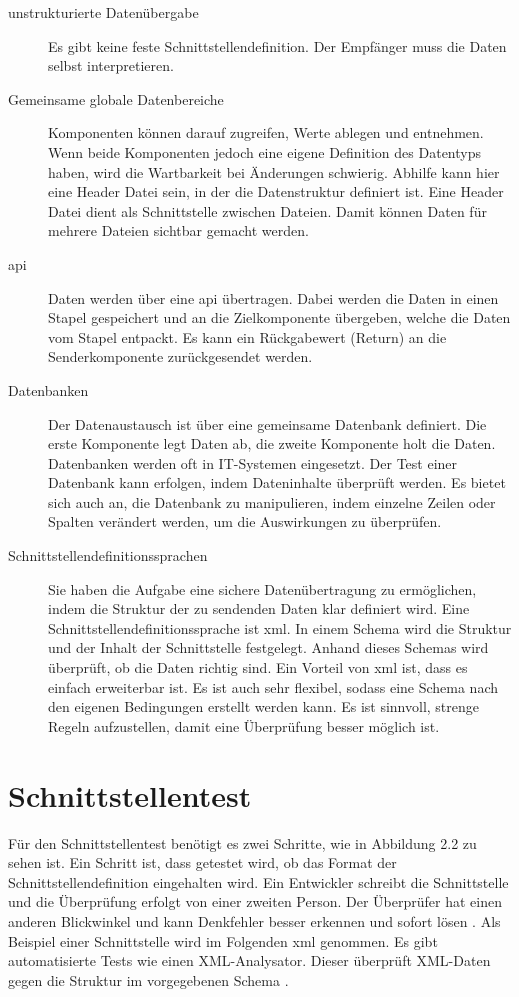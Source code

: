 \begin{description}
\item[unstrukturierte Datenübergabe] Es gibt keine feste Schnittstellendefinition. 
Der Empfänger muss die Daten selbst interpretieren. %
\item[Gemeinsame globale Datenbereiche] Komponenten können darauf zugreifen, Werte ablegen und entnehmen.
Wenn beide Komponenten jedoch eine eigene Definition des Datentyps haben, wird die Wartbarkeit bei Änderungen
schwierig. Abhilfe kann hier eine Header Datei sein, in der die Datenstruktur definiert ist. Eine Header Datei
dient als Schnittstelle zwischen Dateien. Damit können Daten für mehrere Dateien sichtbar gemacht werden.
\item[\ac{api}] Daten werden über eine \ac{api} übertragen. Dabei werden die Daten 
in einen Stapel gespeichert und an die Zielkomponente übergeben, welche die Daten vom Stapel entpackt. Es kann
ein Rückgabewert (Return) an die Senderkomponente zurückgesendet werden.
\item[Datenbanken] Der Datenaustausch ist über eine gemeinsame Datenbank definiert. Die erste Komponente legt
Daten ab, die zweite Komponente holt die Daten. Datenbanken
werden oft in IT-Systemen eingesetzt.
Der Test einer Datenbank kann erfolgen, indem Dateninhalte überprüft werden. Es bietet sich auch an, die Datenbank
zu manipulieren, indem einzelne Zeilen oder Spalten verändert werden, um die Auswirkungen zu überprüfen.
\item[Schnittstellendefinitionssprachen] Sie haben die Aufgabe eine sichere Datenübertragung
zu ermöglichen, indem die Struktur der zu sendenden Daten klar definiert wird.
Eine Schnittstellendefinitionssprache ist \ac{xml}. In einem Schema wird die 
Struktur und der Inhalt der Schnittstelle festgelegt. Anhand dieses Schemas wird überprüft, ob die Daten richtig sind.
Ein Vorteil von \ac{xml} ist, dass es einfach erweiterbar ist. Es ist auch sehr flexibel, sodass eine Schema nach
den eigenen Bedingungen erstellt werden kann. Es ist sinnvoll, strenge Regeln aufzustellen, damit eine Überprüfung besser
möglich ist.
\end{description}


\section*{Schnittstellentest}
Für den Schnittstellentest benötigt es zwei Schritte, wie in Abbildung 2.2 zu sehen ist.
Ein Schritt ist, dass getestet wird, ob das Format der Schnittstellendefinition eingehalten wird.
Ein Entwickler schreibt die Schnittstelle und die Überprüfung erfolgt von einer zweiten Person. Der Überprüfer hat einen
anderen Blickwinkel und kann Denkfehler besser erkennen und sofort lösen \cite[vgl.][S. 226]{integration}.
Als Beispiel einer Schnittstelle wird im Folgenden \ac{xml} genommen.
Es gibt automatisierte Tests wie einen XML-Analysator. Dieser überprüft XML-Daten gegen die Struktur im vorgegebenen
Schema \cite[vgl.][S. 237]{integration}.

